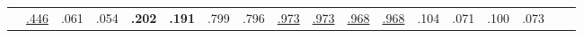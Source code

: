 \begin{table}[t]
{\begin{tabular}{@{} p{0.9cm} p{0.55cm} p{0.55cm} p{0.55cm} p{0.55cm} p{0.55cm} p{0.55cm} p{0.55cm} p{0.55cm} p{0.55cm} p{0.55cm} p{0.55cm} p{0.55cm} p{0.55cm} p{0.52cm} p{0.52cm} p{0.52cm} p{0.52cm} @{}}
  & \multicolumn{1}{c}{{{\underline{.446}}}} %
  & \multicolumn{1}{c}{.061}            %
  & \multicolumn{1}{c}{.054}            %
  & \multicolumn{1}{c}{{{\textbf{.202}}}}   %
  & \multicolumn{1}{c}{{{\textbf{.191}}}}   %
  & \multicolumn{1}{c}{.799}            %
  & \multicolumn{1}{c}{.796}            %
  & \multicolumn{1}{c}{{{\underline{.973}}}} %
  & \multicolumn{1}{c}{{{\underline{.973}}}} %
  & \multicolumn{1}{c}{{\underline{.968}}} %
  & \multicolumn{1}{c}{{\underline{.968}}} %
  & \multicolumn{1}{c}{.104}            %
  & \multicolumn{1}{c}{.071}            %
  & \multicolumn{1}{c}{.100}            %
  & \multicolumn{1}{c}{.073}            %
  \\


\end{tabular}}
\end{table}
